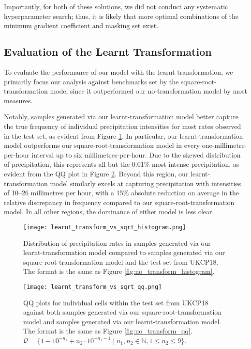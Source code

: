 \documentclass[ oneside,%
                    author={George Herbert},
                    degree={MSci},
                     title={Diffusion Models for Time-Evolving Precipitation Fields},
                  subtitle={}]{dissertation}
\begin{document}
Importantly, for both of these solutions, we did not conduct any systematic hyperparameter search; thus, it is likely that more optimal combinations of the minimum gradient coefficient and masking set exist.

\subsection{Evaluation of the Learnt Transformation}

To evaluate the performance of our model with the learnt transformation, we primarily focus our analysis against benchmarks set by the square-root-transformation model since it outperformed our no-transformation model by most measures.

Notably, samples generated via our learnt-transformation model better capture the true frequency of individual precipitation intensities for most rates observed in the test set, as evident from Figure \ref{fig:learnt_transform_vs_sqrt_histogram}. In particular, our learnt-transformation model outperforms our square-root-transformation model in every one-millimetre-per-hour interval up to six millimetres-per-hour. Due to the skewed distribution of precipitation, this represents all but the 0.01\% most intense precipitation, as evident from the QQ plot in Figure \ref{fig:learnt_transform_vs_sqrt_qq}. Beyond this region, our learnt-transformation model similarly excels at capturing precipitation with intensities of 10--26 millimetres per hour, with a 15\% absolute reduction on average in the relative discrepancy in frequency compared to our square-root-transformation model. In all other regions, the dominance of either model is less clear.

\begin{figure}[htbp]
      \centering
      \texttt{[image: learnt\_transform\_vs\_sqrt\_histogram.png]}
      \caption{Distribution of precipitation rates in samples generated via our learnt-transformation model compared to samples generated via our square-root-transformation model and the test set from UKCP18. The format is the same as Figure \ref{fig:no_transform_histogram}.}
      \label{fig:learnt_transform_vs_sqrt_histogram}
\end{figure}

\begin{figure}[htbp]
      \centering
      \texttt{[image: learnt\_transform\_vs\_sqrt\_qq.png]}
      \caption{QQ plots for individual cells within the test set from UKCP18 against both samples generated via our square-root-transformation model and samples generated via our learnt-transformation model. The format is the same as Figure \ref{fig:no_transform_qq}. $\mathcal{Q} = \{1 - 10^{-n_1} + n_2 \cdot 10^{-n_1 - 1}\mid n_1,n_2\in \mathbb{N}, 1 \le n_2 \le 9\}$.}
      \label{fig:learnt_transform_vs_sqrt_qq}
\end{figure}
\end{document}

